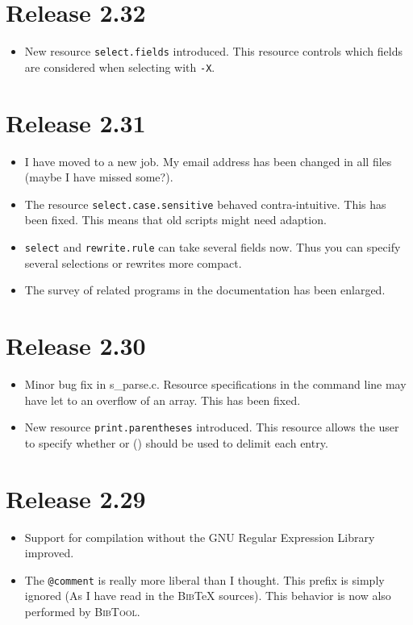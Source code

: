 \documentclass[11pt,a4paper]{scrartcl}
\newcommand\Arg[1]{\texttt{#1}}
\newcommand\rsc[1]{\texttt{#1}}
\newcommand\File[1]{\textsf{#1}}
\newcommand\BibTool{\textsc{BibTool}}
\newcommand\BibTeX{\textsc{Bib}\TeX}
\newenvironment{Release}[2]{%
  \def\tmp{#2}%
  \section*{Release #1 \ifx\tmp\empty\else{\normalsize[#2]}\fi}
  \begin{itemize}
}{\end{itemize}}
\newenvironment{Fix}[1]{\item }{}
\newenvironment{New}[1]{\item }{}
\newenvironment{Doc}[1]{\item }{}
\newenvironment{Update}[1]{\item }{}
\begin{document}
\begin{multicols}
 \begin{Release}{2.32}{}
  \begin{New}{gene}
    New resource \rsc{select.fields} introduced. This resource
    controls which fields are considered when selecting with
    \Arg{-X}.
  \end{New}
 \end{Release}

 \begin{Release}{2.31}{}
  \begin{Update}{gene}
    I have moved to a new job. My email address has been changed in
    all files (maybe I have missed some?).
  \end{Update}
  \begin{Fix}{gene}
    The resource \rsc{select.case.sensitive} behaved
    contra-intuitive. This has been fixed. This means that old scripts
    might need adaption.
  \end{Fix}
  \begin{Update}{gene}
    \rsc{select} and 
\rsc{rewrite.rule} can take several
    fields now. Thus you can specify several selections or rewrites
    more compact.
  \end{Update}
  \begin{Doc}{gene}
    The survey of related programs in the documentation has been
    enlarged.
  \end{Doc}
 \end{Release}

 \begin{Release}{2.30}{}
  \begin{Fix}{gene}
    Minor bug fix in \File{s\_parse.c}. Resource specifications in
    the command line may have let to an overflow of an array. This has
    been fixed.
  \end{Fix}
  \begin{New}{gene}
    New resource \rsc{print.parentheses} introduced. This
    resource allows the user to specify whether {} or () should be
    used to delimit each entry.
  \end{New}
 \end{Release}

 \begin{Release}{2.29}{}
  \begin{Update}{gene}
    Support for compilation without the GNU Regular Expression Library
    improved.
  \end{Update}
  \begin{Update}{gene}
    The \verb|@comment| is really more liberal than I thought. This
    prefix is simply ignored (As I have read in the \BibTeX{}
    sources). This behavior is now also performed by \BibTool{}.
  \end{Update}
 \end{Release}


\end{multicols}
\end{document}

